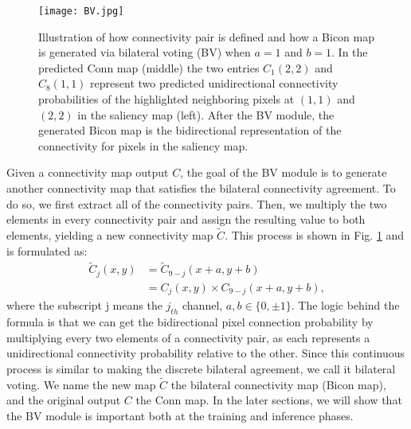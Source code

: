 \documentclass[final]{cvpr}
\begin{document}
\begin{figure}[h!]
\begin{center}
   \texttt{[image: BV.jpg]}
\end{center}
\vspace{-20pt}
\caption{Illustration of how connectivity pair is defined and how a Bicon map is generated via bilateral voting (BV) when $a = 1$ and $b = 1$. In the predicted Conn map (middle) the two entries $C_1(2,2)$ and $C_8(1,1)$ represent two predicted unidirectional connectivity probabilities of the highlighted neighboring pixels at $(1,1)$ and $(2,2)$ in the saliency map (left). After the BV module, the generated Bicon map is the bidirectional representation of the connectivity for pixels in the saliency map. }
\label{bv}
\vspace{-10pt}
\end{figure}

Given a connectivity map output $C$, the goal of the BV module is to generate another connectivity map that satisfies the bilateral connectivity agreement. To do so, we first extract all of the connectivity pairs. Then, we multiply the two elements in every connectivity pair and assign the resulting value to both elements, yielding a new connectivity map $\widetilde {C}$. This process is shown in Fig. \ref{bv} and is formulated as: 		
\begin{equation}
\begin{split}
{\widetilde C_j}(x,y) &= {\widetilde C_{9 - j}}(x + a,y + b) \\
&= {C_j}(x,y) \times {C_{9 - j}}(x + a,y + b),
\end{split}
\end{equation}
where the subscript j means the $j_{th}$ channel, $a,b \in \{ 0, \pm 1\}$. The logic behind the formula is that we can get the bidirectional pixel connection probability by multiplying every two elements of a connectivity pair, as each represents a unidirectional connectivity probability relative to the other. Since this continuous process is similar to making the discrete bilateral agreement, we call it bilateral voting. We name the new map $\widetilde {C}$ the bilateral connectivity map (Bicon map), and the original output $C$ the Conn map. In the later sections, we will show that the BV module is important both at the training and inference phases. 
\end{document}

